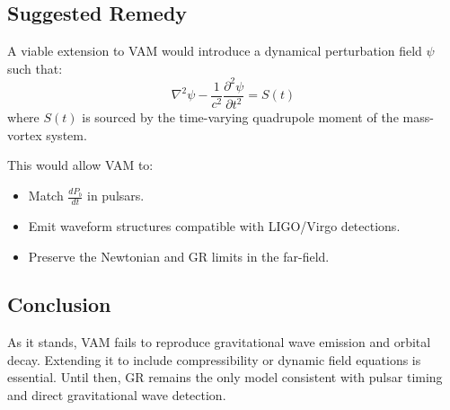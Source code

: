 \subsection*{Suggested Remedy}

A viable extension to VAM would introduce a dynamical perturbation field $\psi$ such that:
\begin{equation}
    \nabla^2 \psi - \frac{1}{c^2} \frac{\partial^2 \psi}{\partial t^2} = S(t)
\end{equation}
where $S(t)$ is sourced by the time-varying quadrupole moment of the mass-vortex system.

This would allow VAM to:
\begin{itemize}
    \item Match $\frac{dP_b}{dt}$ in pulsars.
    \item Emit waveform structures compatible with LIGO/Virgo detections.
    \item Preserve the Newtonian and GR limits in the far-field.
\end{itemize}

\subsection*{Conclusion}

As it stands, VAM fails to reproduce gravitational wave emission and orbital decay. Extending it to include compressibility or dynamic field equations is essential. Until then, GR remains the only model consistent with pulsar timing and direct gravitational wave detection.